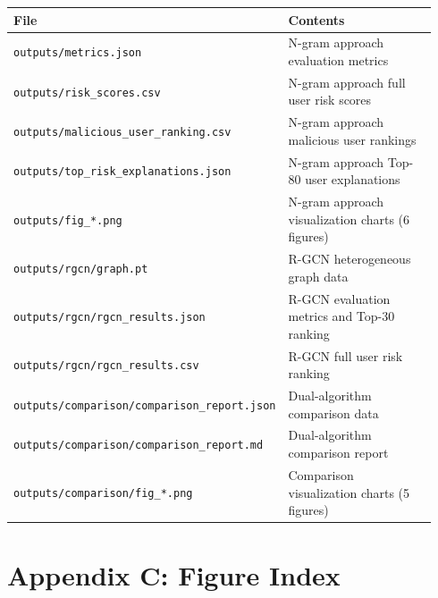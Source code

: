 \documentclass[
  a4paper,
  11pt]{article}
\newcounter{none} %
\begin{document}
{\def\LTcaptype{none} %
\begin{longtable}[]{@{}>{\raggedright\arraybackslash}p{0.28\linewidth}>{\raggedright\arraybackslash}p{0.66\linewidth}@{}}
\toprule\noalign{}
File & Contents \\
\midrule\noalign{}
\endhead
\bottomrule\noalign{}
\endlastfoot
\texttt{outputs/metrics.json} & N-gram approach evaluation metrics \\
\texttt{outputs/risk\_scores.csv} & N-gram approach full user risk
scores \\
\texttt{outputs/malicious\_user\_ranking.csv} & N-gram approach
malicious user rankings \\
\texttt{outputs/top\_risk\_explanations.json} & N-gram approach Top-80
user explanations \\
\texttt{outputs/fig\_*.png} & N-gram approach visualization charts (6
figures) \\
\texttt{outputs/rgcn/graph.pt} & R-GCN heterogeneous graph data \\
\texttt{outputs/rgcn/rgcn\_results.json} & R-GCN evaluation metrics and
Top-30 ranking \\
\texttt{outputs/rgcn/rgcn\_results.csv} & R-GCN full user risk
ranking \\
\texttt{outputs/comparison/comparison\_report.json} & Dual-algorithm
comparison data \\
\texttt{outputs/comparison/comparison\_report.md} & Dual-algorithm
comparison report \\
\texttt{outputs/comparison/fig\_*.png} & Comparison visualization charts
(5 figures) \\
\end{longtable}
}

\section{Appendix C: Figure Index}\label{appendix-c-figure-index}
\end{document}
